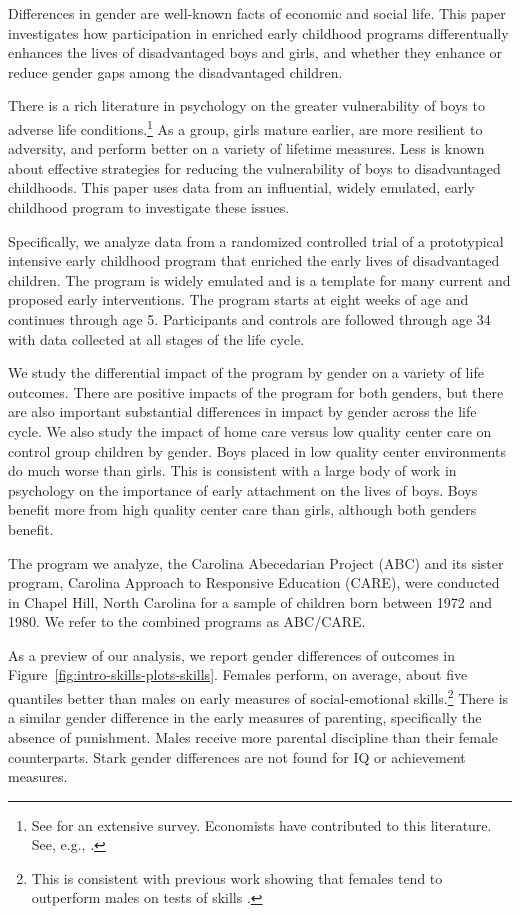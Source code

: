 Differences in gender are well-known facts of economic and social life. This paper investigates how participation in enriched early childhood programs differentually enhances the lives of disadvantaged boys and girls, and whether they enhance or reduce gender gaps among the disadvantaged children.

There is a rich literature in psychology on the greater vulnerability of boys to adverse life conditions.\footnote{See \cite{Schore_2017_IMHJ} for an extensive survey. Economists have contributed to this literature. See, e.g., \cite{Autor-etal_2015_Family-Disadvantage}.} As a group, girls mature earlier, are more resilient to adversity, and perform better on a variety of lifetime measures. Less is known about effective strategies for reducing the vulnerability of boys to disadvantaged childhoods. This paper uses data from an influential, widely emulated, early childhood program to investigate these issues.

Specifically, we analyze data from a randomized controlled trial of a prototypical intensive early childhood program that enriched the early lives of disadvantaged children. The program is widely emulated and is a template for many current and proposed early interventions. The program starts at eight weeks of age and continues through age 5. Participants and controls are followed through age 34 with data collected at all stages of the life cycle.

We study the differential impact of the program by gender on a variety of life outcomes. There are positive impacts of the program for both genders, but there are also important substantial differences in impact by gender across the life cycle. We also study the impact of home care versus low quality center care on control group children by gender. Boys placed in low quality center environments do much worse than girls. This is consistent with a large body of work in psychology on the importance of early attachment on the lives of boys. Boys benefit more from high quality center care than girls, although both genders benefit.


The program we analyze, the Carolina Abecedarian Project (ABC) and its sister program, Carolina Approach to Responsive Education (CARE), were conducted in Chapel Hill, North Carolina for a sample of children born between 1972 and 1980. We refer to the combined programs as ABC/CARE.

As a preview of our analysis, we report gender differences of outcomes in Figure~\ref{fig:intro-skills-plots-skills}. Females perform, on average, about five quantiles better than males on early measures of social-emotional skills.\footnote{This is consistent with previous work showing that females tend to outperform males on tests of skills \citep{Baker-Milligan_2013_Boy-Girl-Differences}.} There is a similar gender difference in the early measures of parenting, specifically the absence of punishment. Males receive more parental discipline than their female counterparts. Stark gender differences are not found for IQ or achievement measures.

